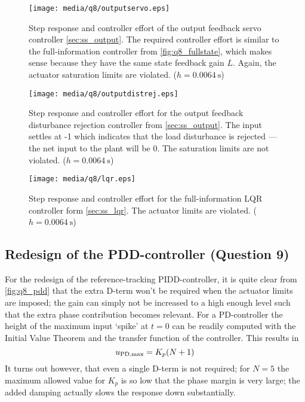 \begin{figure}[ht!]
    \centering
    \texttt{[image: media/q8/outputservo.eps]}
    \caption{Step response and controller effort of the output feedback servo controller \cref{sec:ss_output}. The required controller effort is similar to the full-information controller from \cref{fig:q8_fullstate}, which makes sense because they have the same state feedback gain $L$. Again, the actuator saturation limits are violated. ($h = \SI{0.0064}{\second}$)}
    \label{fig:q8_outputservo}
\end{figure}

\begin{figure}[ht!]
    \centering
    \texttt{[image: media/q8/outputdistrej.eps]}
    \caption{Step response and controller effort for the output feedback disturbance rejection controller from \cref{sec:ss_output}. The input settles at -1 which indicates that the load disturbance is rejected --- the net input to the plant will be 0. The saturation limits are not violated. ($h = \SI{0.0064}{\second}$)}
    \label{fig:q8_outputdistrej}
\end{figure}
\FloatBarrier
\begin{figure}[ht!]
    \centering
    \texttt{[image: media/q8/lqr.eps]}
    \caption{Step response and controller effort for the full-information LQR controller form \cref{sec:ss_lqr}. The actuator limits are violated. ($h = \SI{0.0064}{\second}$)}
    \label{fig:q8_lqr}
\end{figure}
\subsection{Redesign of the PDD-controller \textnormal{\phantom{xxx}(Question 9)}}
\label{sec:retunepid}
For the redesign of the reference-tracking PIDD-controller, it is quite clear from \cref{fig:q8_pdd} that the extra D-term won't be required when the actuator limits are imposed; the gain can simply not be increased to a high enough level such that the extra phase contribution becomes relevant. For a PD-controller the height of the maximum input `spike' at $t=0$ can be readily computed with the Initial Value Theorem and the transfer function of the controller. This results in
$$ u_{\text{PD,max}} = K_p\qty(N + 1)$$
It turns out however, that even a single D-term is not required; for $N = 5$ the maximum allowed value for $K_p$ is so low that the phase margin is very large; the added damping actually slows the response down substantially. 

